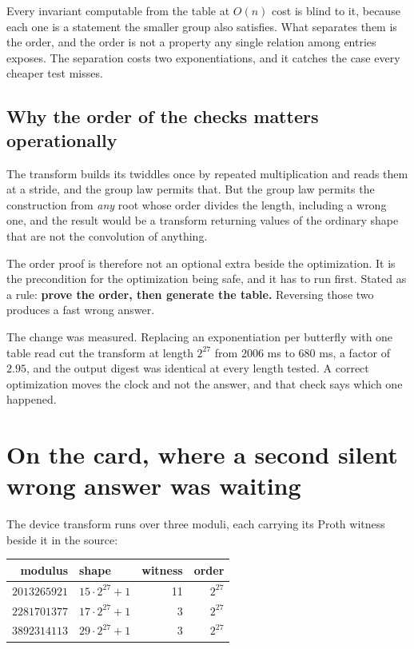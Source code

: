 Every invariant computable from the table at \(O(n)\) cost is blind to it, because each one is a statement the smaller group also satisfies. What separates them is the order, and the order is not a property any single relation among entries exposes. The separation costs two exponentiations, and it catches the case every cheaper test misses.

\subsection{Why the order of the checks matters operationally}

The transform builds its twiddles once by repeated multiplication and reads them at a stride, and the group law permits that. But the group law permits the construction from \emph{any} root whose order divides the length, including a wrong one, and the result would be a transform returning values of the ordinary shape that are not the convolution of anything.

The order proof is therefore not an optional extra beside the optimization. It is the precondition for the optimization being safe, and it has to run first. Stated as a rule: \textbf{prove the order, then generate the table.} Reversing those two produces a fast wrong answer.

The change was measured. Replacing an exponentiation per butterfly with one table read cut the transform at length \(2^{27}\) from \(2006\) ms to \(680\) ms, a factor of \(2.95\), and the output digest was identical at every length tested. A correct optimization moves the clock and not the answer, and that check says which one happened.

\section{On the card, where a second silent wrong answer was waiting}

The device transform runs over three moduli, each carrying its Proth witness beside it in the source:

\begin{center}
\begin{tabular}{@{}rlrr@{}}
\toprule
modulus & shape & witness & order \\
\midrule
\(2013265921\) & \(15 \cdot 2^{27} + 1\) & 11 & \(2^{27}\) \\
\(2281701377\) & \(17 \cdot 2^{27} + 1\) & 3 & \(2^{27}\) \\
\(3892314113\) & \(29 \cdot 2^{27} + 1\) & 3 & \(2^{27}\) \\
\bottomrule
\end{tabular}
\end{center}

